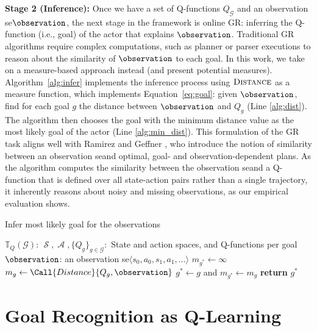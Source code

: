\documentclass[letterpaper]{article}
\DeclareMathOperator{\statespace}{\mathcal{S}}
\DeclareMathOperator{\actionspace}{\mathcal{A}}
\providecommand\theory{\mathbb{T}}
\providecommand\goals{\mathcal{G}}
\providecommand\goal{g}
\begin{document}
\noindent \textbf{Stage 2 (Inference):} Once we have a set of Q-functions $Q_{\goals}$ and an observation se$\observation$, the next stage in the framework is online GR: inferring the Q-function (i.e., goal) of the actor that explains $\observation$.
Traditional GR algorithms require complex computations, such as planner or parser executions to reason about the similarity of $\observation$ to each goal.
In this work, we take on a measure-based approach instead (and present potential measures).
Algorithm~\ref{alg:infer} implements the inference process using $\textsc{Distance}$ as a measure function, which implements Equation~\ref{eq:goal}: given $\observation$, find for each goal $g$ the distance between $\observation$ and $Q_g$ (Line \ref{alg:dist}).
The algorithm then chooses the goal with the minimum distance value as the most likely goal of the actor (Line \ref{alg:min_dist}).
This formulation of the GR task aligns well with Ramirez and Geffner , who introduce the notion of similarity between an observation seand optimal, goal- and observation-dependent plans.
As the algorithm computes the similarity between the observation seand a Q-function that is defined over all state-action pairs rather than a single trajectory, it inherently reasons about noisy and missing observations, as our empirical evaluation shows.


\begin{algorithm}[t]
    \caption{Infer most likely goal for the observations}
    \label{alg:infer}
\begin{algorithmic}[1]
    \Require $\theory_Q(\goals)$: $\statespace, \actionspace, \{Q_g\}_{g \in \goals}:$ State and action spaces, and Q-functions per goal
    \Require $\observation$: an observation se$\langle s_0, a_0, s_1, a_1, \ldots \rangle$
    \State $m_{g^*} \gets \infty$ 
    \ForAll{$\goal \in \goals$} 
        \State $m_g \gets \Call{Distance}{Q_g, \observation}$ 
        \label{alg:dist}
            \State $g^* \gets g$ and $m_{g^*} \gets m_g$
        \EndIf
    \EndFor
    \State \textbf{return} $g^*$
    \label{alg:min_dist}
\end{algorithmic}
\end{algorithm}


\section*{Goal Recognition as Q-Learning}
\label{sec:graql}
\end{document}
